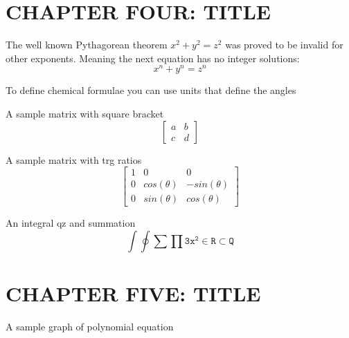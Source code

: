 \documentclass[12pt]{report}    %
\begin{document}
\chapter{\MakeUppercase{chapter Four: title }} 


The well known Pythagorean theorem \(x^2 + y^2 = z^2\) was 
proved to be invalid for other exponents. 
Meaning the next equation has no integer solutions:
\[ x^n + y^n = z^n \]


To define chemical formulae you can use units that define the angles


A sample matrix with square bracket
\[\begin{bmatrix}
  
  a   &   b \\
  c   &     d
\end{bmatrix}\]

A sample matrix with trg ratios 
\[\begin{bmatrix}
  1 & 0 &  0 \\
  0 & cos(\theta) & -sin(\theta) \\
  0 & sin(\theta)  & cos(\theta)
\end{bmatrix}\] 

An integral qz and summation
\begin{equation}
  \int \oint \sum \prod
  \mathtt{3x^2 \in R \subset Q} 
\end{equation}


\chapter{\MakeUppercase{chapter five: title}} 
A sample graph of polynomial equation
\end{document}
